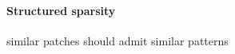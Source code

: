 \paragraph{Structured sparsity}
similar patches should admit similar patterns \cite{Mairal2009} 
\cite{group sparsity}








